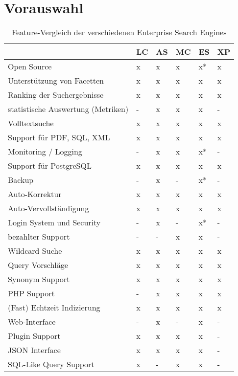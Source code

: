 \cite{XAP.2019}

\section {Vorauswahl}

\begin{table} %
	\centering
		\begin{tabular}{l | l | l | l | l | l}
		& \textbf{LC} & \textbf{AS} & \textbf{MC} & \textbf{ES}  & \textbf{XP} \\
        \hline
        Open Source                                 & x & x & x & x* & x \\
        Unterstützung von Facetten                  & x & x & x & x  & x \\
        Ranking der Suchergebnisse                  & x & x & x & x  & x \\
        statistische Auswertung (Metriken)          & - & x & x & x  & - \\
        Volltextsuche                               & x & x & x & x  & x \\
        Support für PDF, SQL, XML                   & x & x & x & x  & x \\
        Monitoring / Logging                        & - & x & x & x* & - \\
        Support für PostgreSQL                      & x & x & x & x  & x \\
        Backup                                      & - & x & - & x* & - \\
        Auto-Korrektur                              & x & x & x & x  & x \\
        Auto-Vervollständigung                      & x & x & x & x  & x \\
        Login System und Security                   & - & x & - & x* & - \\
        bezahlter Support                           & - & - & x & x  & - \\
        Wildcard Suche                              & x & x & x & x  & x \\
        Query Vorschläge                            & x & x & x & x  & x \\
        Synonym Support                             & x & x & x & x  & x \\
        PHP Support                                 & - & x & x & x  & x \\
        (Fast) Echtzeit Indizierung                 & x & x & x & x  & x \\
        Web-Interface                               & - & x & - & x  & - \\
        Plugin Support                              & x & x & x & x  & - \\
        JSON Interface                              & x & x & x & x  & - \\
        SQL-Like Query Support                      & x & - & x & x  & - \\
		\end{tabular}
	\caption{Feature-Vergleich der verschiedenen Enterprise Search Engines}
    \label{vglTable}


\end{table}
